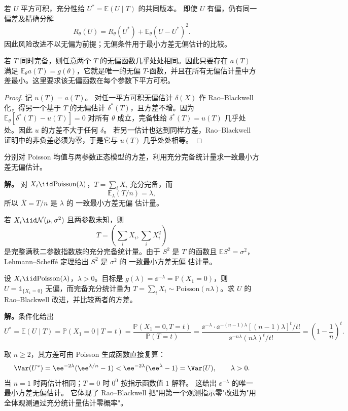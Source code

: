 \begin{corollary}[条件化也改进有偏估计的平方风险]
若 $U$ 平方可积，充分性给 $U^*=\mathbb E(U\mid T)$ 的共同版本。
即使 $U$ 有偏，仍有同一偏差及精确分解
\[
 R_\theta(U)=R_\theta(U^*)+\mathbb E_\theta(U-U^*)^2.
\]
因此风险改进不以无偏为前提；无偏条件用于最小方差无偏估计的比较。
\end{corollary}

\begin{theorem}
若 $T$ 同时完备，则任意两个 $T$ 的无偏函数几乎处处相同。因此只要存在 $a(T)$ 满足 $\mathbb E_\theta a(T)=g(\theta)$，它就是唯一的无偏 $T$-函数，并且在所有无偏估计量中方差最小。这里要求该无偏函数在每个参数下平方可积。
\end{theorem}

\begin{proof}
记 \(u(T)=a(T)\)。
对任一平方可积无偏估计 \(\delta(X)\) 作 Rao--Blackwell 化，得另一个基于 \(T\) 的无偏估计 \(\delta^*(T)\)，且方差不增。因为
\(\mathbb E_\theta[\delta^*(T)-u(T)]=0\) 对所有 \(\theta\) 成立，完备性给
\(\delta^*(T)=u(T)\) 几乎处处。因此 \(u\) 的方差不大于任何 \(\delta\)。
若另一估计也达到同样方差，Rao--Blackwell 证明中的非负差必须为零，于是它与 \(u(T)\) 几乎处处相等。
\end{proof}

\begin{exbox}
分别对 Poisson 均值与两参数正态模型的方差，利用充分完备统计量求一致最小方差无偏估计。

\textbf{解。} 对 $X_i\iid\mathrm{Poisson}(\lambda)$，$T=\sum_iX_i$ 充分完备，而
\[
 \mathbb E_\lambda(T/n)=\lambda,
\]
所以 $\overline X=T/n$ 是 $\lambda$ 的 一致最小方差无偏 估计量。

若 $X_i\iid\mathcal N(\mu,\sigma^2)$ 且两参数未知，则
\[
 T=\left(\sum_iX_i,\sum_iX_i^2\right)
\]
是完整满秩二参数指数族的充分完备统计量。由于 $S^2$ 是 $T$ 的函数且 $\mathbb E S^2=\sigma^2$，Lehmann--Scheffé 定理给出 $S^2$ 是 $\sigma^2$ 的 一致最小方差无偏 估计量。
\end{exbox}

\begin{workedexample}[从单个零计数到全样本估计]
设 $X_i\iid\mathrm{Poisson}(\lambda)$，$\lambda>0$。目标是 $g(\lambda)=\ee^{-\lambda}=\mathbb P(X_1=0)$，则 $U=\mathds{1}_{\{X_1=0\}}$ 无偏，而完备充分统计量为 $T=\sum_i X_i\sim\mathrm{Poisson}(n\lambda)$。求 $U$ 的 Rao--Blackwell 改进，并比较两者的方差。

\textbf{解。}条件化给出
\[
U^*=\mathbb E(U\mid T)=\mathbb P(X_1=0\mid T=t)
=\frac{\mathbb P(X_1=0,T=t)}{\mathbb P(T=t)}
=\frac{\ee^{-\lambda}\cdot\ee^{-(n-1)\lambda}[(n-1)\lambda]^t/t!}{\ee^{-n\lambda}(n\lambda)^t/t!}
=\left(1-\frac1n\right)^t.
\]

取 $n\ge2$，其方差可由 Poisson 生成函数直接复算：
\[
 \Var(U^*)=\ee^{-2\lambda}(\ee^{\lambda/n}-1)
 <\ee^{-2\lambda}(\ee^\lambda-1)=\Var(U),\qquad\lambda>0.
\]
当 $n=1$ 时两估计相同；$T=0$ 时 $0^0$ 按指示函数值 $1$ 解释。
这给出 $\ee^{-\lambda}$ 的唯一最小方差无偏估计。
它体现了 Rao--Blackwell 把"用第一个观测指示零"改进为"用全体观测通过充分统计量估计零概率"。
\end{workedexample}

